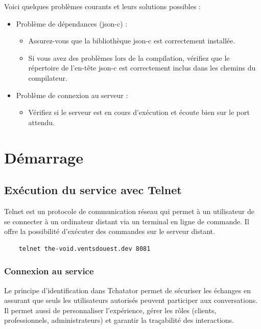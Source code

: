 \documentclass{report}
\begin{document}
Voici quelques problèmes courants et leurs solutions possibles :

\begin{itemize}
	\item Problème de dépendances (json-c) :
	\begin{itemize}
		\item Assurez-vous que la bibliothèque json-c est correctement installée.
		\item Si vous avez des problèmes lors de la compilation, vérifiez que le répertoire de l'en-tête json-c est correctement inclus dans les chemins du compilateur.
	\end{itemize}
	\item Problème de connexion au serveur :
	\begin{itemize}
		\item Vérifiez si le serveur est en cours d'exécution et écoute bien sur le port attendu.
	\end{itemize}
\end{itemize}

\chapter{Démarrage}

\section{Exécution du service avec Telnet}

Telnet est un protocole de communication réseau qui permet à un utilisateur de se connecter à un ordinateur distant via un terminal en ligne de commande. Il offre la possibilité d’exécuter des commandes sur le serveur distant.

\begin{verbatim}
	telnet the-void.ventsdouest.dev 8081
\end{verbatim}

\subsection{Connexion au service}

Le principe d'identification dans Tchatator permet de sécuriser les échanges en assurant que seuls les utilisateurs autorisés peuvent participer aux conversations. Il permet aussi de personnaliser l'expérience, gérer les rôles (clients, professionnels, administrateurs) et garantir la traçabilité des interactions.
\end{document}
